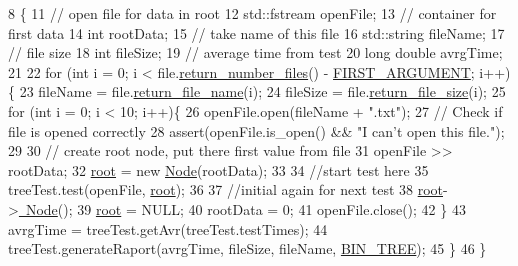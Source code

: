 \begin{DoxyCode}
8                                                \{
11     \textcolor{comment}{// open file for data in root}
12     std::fstream openFile;
13     \textcolor{comment}{// container for first data}
14     \textcolor{keywordtype}{int} rootData;
15     \textcolor{comment}{// take name of this file}
16     std::string fileName;
17     \textcolor{comment}{// file size}
18     \textcolor{keywordtype}{int} fileSize;
19     \textcolor{comment}{// average time from test}
20     \textcolor{keywordtype}{long} \textcolor{keywordtype}{double} avrgTime;
21 
22     \textcolor{keywordflow}{for} (\textcolor{keywordtype}{int} i = 0; i < file.\hyperlink{class_input_files_a3db5accd81913e0b89fdd3b4650c8923}{return\_number\_files}() - 
      \hyperlink{inputfile__txt_8h_ac6795aca310766e1b10d90013aac6d47}{FIRST\_ARGUMENT}; i++)\{
23         fileName = file.\hyperlink{class_input_files_a9246bc217efcfa1569478bcf44e1cd20}{return\_file\_name}(i);
24         fileSize = file.\hyperlink{class_input_files_a9c65bfcc0e684642c40c999959d6d014}{return\_file\_size}(i);
25         \textcolor{keywordflow}{for} (\textcolor{keywordtype}{int} i = 0; i < 10; i++)\{
26             openFile.open(fileName + \textcolor{stringliteral}{".txt"});
27             \textcolor{comment}{// Check if file is opened correctly}
28             assert(openFile.is\_open() && \textcolor{stringliteral}{"I can't open this file."});
29 
30             \textcolor{comment}{// create root node, put there first value from file}
31             openFile >> rootData;
32             \hyperlink{class_tree_adea11d0e123823b769f7c3ee9a5a1088}{root} = \textcolor{keyword}{new} \hyperlink{class_node}{Node}(rootData);
33 
34             \textcolor{comment}{//start test here}
35             treeTest.test(openFile, \hyperlink{class_tree_adea11d0e123823b769f7c3ee9a5a1088}{root});
36 
37             \textcolor{comment}{//initial again for next test}
38             \hyperlink{class_tree_adea11d0e123823b769f7c3ee9a5a1088}{root}->\hyperlink{class_node_aa0840c3cb5c7159be6d992adecd2097c}{~Node}();
39             \hyperlink{class_tree_adea11d0e123823b769f7c3ee9a5a1088}{root} = NULL;
40             rootData = 0;
41             openFile.close();
42         \}
43         avrgTime = treeTest.getAvr(treeTest.testTimes);
44         treeTest.generateRaport(avrgTime, fileSize, fileName, \hyperlink{benchmark__frm_8h_ac2ad7f431e3446fddcd9b6b9f93c4c14ae7f0b7f228990e5b8ce4a9541f26c062}{BIN\_TREE});
45     \}
46 \}
\end{DoxyCode}
\hypertarget{class_tree_abdc38545cf3f588725b5d8b8075b3866}{}
